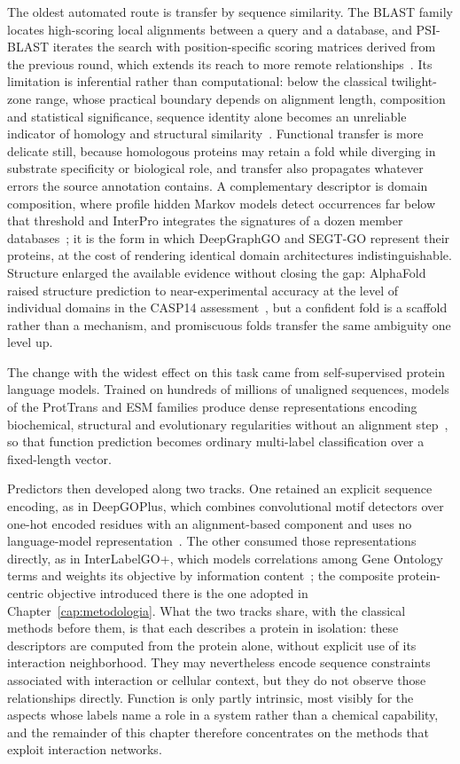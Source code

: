 \documentclass[Ingles]{ic-tese-v3}
\begin{document}
The oldest automated route is transfer by sequence similarity. The BLAST family locates high-scoring
local alignments between a query and a database, and PSI-BLAST iterates the search with
position-specific scoring matrices derived from the previous round, which extends its reach to more
remote relationships~\cite{altschul1997gapped}. Its limitation is inferential rather than
computational: below the classical twilight-zone range, whose practical boundary depends on
alignment length, composition and statistical significance, sequence identity alone becomes an
unreliable indicator of homology and structural similarity~\cite{rost1999twilight}. Functional
transfer is more delicate still, because homologous proteins may retain a fold while diverging in
substrate specificity or biological role, and transfer also propagates whatever errors the source
annotation contains. A complementary descriptor is domain composition, where profile hidden Markov
models detect occurrences far below that threshold and InterPro integrates the signatures of a dozen
member databases~\cite{blum2025interpro}; it is the form in which DeepGraphGO and SEGT-GO represent
their proteins, at the cost of rendering identical domain architectures indistinguishable. Structure
enlarged the available evidence without closing the gap: AlphaFold raised structure prediction to
near-experimental accuracy at the level of individual domains in the CASP14
assessment~\cite{jumper2021alphafold}, but a confident fold is a scaffold rather than a mechanism,
and promiscuous folds transfer the same ambiguity one level up.

The change with the widest effect on this task came from self-supervised protein language models.
Trained on hundreds of millions of unaligned sequences, models of the ProtTrans and ESM families
produce dense representations encoding biochemical, structural and evolutionary regularities without
an alignment step~\cite{elnaggar2021prottrans,rives2021esm1b}, so that function prediction becomes
ordinary multi-label classification over a fixed-length vector.

Predictors then developed along two tracks. One retained an explicit sequence encoding, as in
DeepGOPlus, which combines convolutional motif detectors over one-hot encoded residues with an
alignment-based component and uses no language-model representation~\cite{kulmanov2020deepgoplus}.
The other consumed those representations directly, as in InterLabelGO+, which models correlations
among Gene Ontology terms and weights its objective by information
content~\cite{liu2024interlabelgo}; the composite protein-centric objective introduced there is the
one adopted in Chapter~\ref{cap:metodologia}. What the two tracks share, with the classical methods
before them, is that each describes a protein in isolation: these descriptors are computed from the
protein alone, without explicit use of its interaction neighborhood. They may nevertheless encode
sequence constraints associated with interaction or cellular context, but they do not observe those
relationships directly. Function is only partly intrinsic, most visibly for the aspects whose labels
name a role in a system rather than a chemical capability, and the remainder of this chapter
therefore concentrates on the methods that exploit interaction networks.
\end{document}
